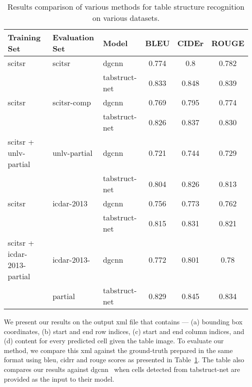 \documentclass[runningheads]{llncs}
\begin{document}
\begin{table}[ht!]
\addtolength{\tabcolsep}{-1.5pt}
\begin{center}
\begin{tabular}{|l |l | l |c c c|} \hline
\textbf{Training Set} &\textbf{Evaluation Set} &\textbf{Model} &\textbf{BLEU} &\textbf{CIDEr} &\textbf{ROUGE} \\ \hline 
{\sc s}ci{\sc tsr} &{\sc s}ci{\sc tsr} &{\sc dgcnn} & 0.774 &0.8 &0.782 \\ \cline{3-6}
 &    &{\sc t}ab{\sc s}truct-{\sc n}et &0.833 &0.848 &0.839 \\ \hline  
{\sc s}ci{\sc tsr} &{\sc s}ci{\sc tsr-comp} &{\sc dgcnn} &0.769 &0.795 &0.774 \\ \cline{3-6} 
 &  &{\sc t}ab{\sc s}truct-{\sc n}et &0.826 &0.837 &0.830 \\ \hline
{\sc s}ci{\sc tsr} + {\sc unlv}-partial &{\sc unlv}-partial &{\sc dgcnn} &0.721 &0.744 &0.729 \\ \cline{3-6} 
 &  &{\sc t}ab{\sc s}truct-{\sc n}et &0.804 &0.826 &0.813 \\ \hline
 {\sc s}ci{\sc tsr}  &{\sc icdar-2013} &{\sc dgcnn} &0.756 &0.773 &0.762 \\ \cline{3-6} 
 &  &{\sc t}ab{\sc s}truct-{\sc n}et &0.815 &0.831 &0.821 \\ \hline
 {\sc s}ci{\sc tsr} + {\sc icdar-2013}-partial  &{\sc icdar-2013-} &{\sc dgcnn} &0.772 &0.801 &0.78 \\ \cline{3-6} 
 &partial  &{\sc t}ab{\sc s}truct-{\sc n}et &0.829 &0.845 &0.834 \\ \hline
 \end{tabular}
\end{center}
\caption{Results comparison of various methods for table structure recognition on various datasets.} \label{table_table_understanding}
\end{table}

We present our results on the output {\sc xml} file that contains --- (a) bounding box coordinates, (b) start and end row indices, (c) start and end column indices, and (d) content for every predicted cell given the table image. To evaluate our method, we compare this {\sc xml} against the ground-truth prepared in the same format using {\sc bleu}, {\sc cidr}r and {\sc rouge} scores as presented in Table~\ref{table_table_understanding}. The table also compares our results against {\sc dgcnn}~\cite{qasim2019rethinking} when cells detected from {\sc t}ab{\sc s}truct-{\sc n}et are provided as the input to their model.
\end{document}
